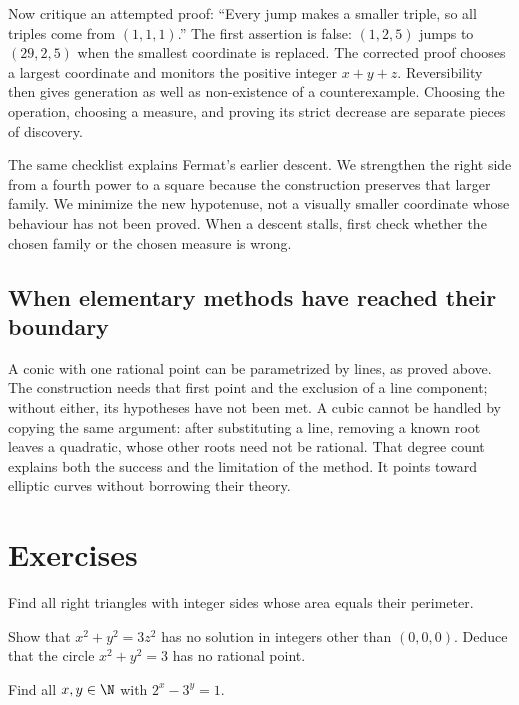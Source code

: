 Now critique an attempted proof: ``Every jump makes a smaller triple, so
all triples come from $(1,1,1)$.'' The first assertion is false:
$(1,2,5)$ jumps to $(29,2,5)$ when the smallest coordinate is replaced.
The corrected proof chooses a largest coordinate and monitors the positive
integer $x+y+z$. Reversibility then gives generation as well as non-existence
of a counterexample. Choosing the operation, choosing a measure, and
proving its strict decrease are separate pieces of discovery.

The same checklist explains Fermat's earlier descent. We strengthen the
right side from a fourth power to a square because the construction preserves
that larger family. We minimize the new hypotenuse, not a visually smaller
coordinate whose behaviour has not been proved. When a descent stalls,
first check whether the chosen family or the chosen measure is wrong.

\subsection*{When elementary methods have reached their boundary}
A conic with one rational point can be parametrized by lines, as proved
above. The construction needs that first point and the exclusion of a line
component; without either, its hypotheses have not been met. A cubic cannot
be handled by copying the same argument: after substituting a line, removing
a known root leaves a quadratic, whose other roots need not be rational.
That degree count explains both the success and the limitation of the method.
It points toward elliptic curves without borrowing their theory.

\section{Exercises}

\begin{exercise}[$\star$]\label{ex:areaper}
Find all right triangles with integer sides whose area equals their perimeter.
\end{exercise}

\begin{exercise}[$\star$]\label{ex:x2y23z2}
Show that $x^2+y^2=3z^2$ has no solution in integers other than $(0,0,0)$. Deduce that the circle $x^2+y^2=3$ has no rational point.
\end{exercise}

\begin{exercise}[$\star$]\label{ex:catalan23}
Find all $x,y\in\N$ with $2^x-3^y=1$.
\end{exercise}


